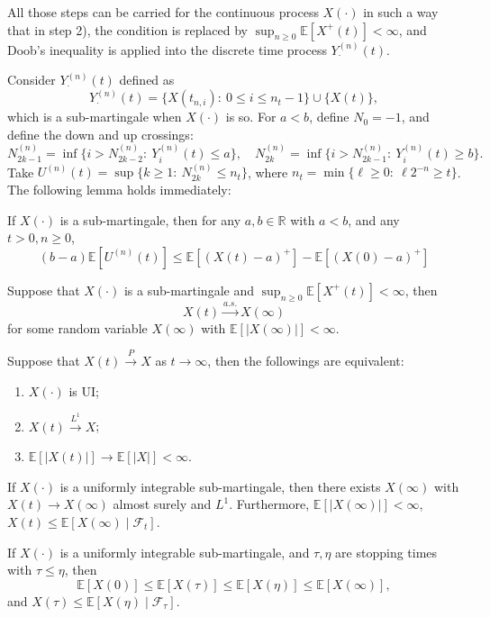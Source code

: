 All those steps can be carried for the continuous process $X(\cdot)$ in such a way that in step 2), the condition is replaced by $\sup_{n\ge0}\mathbb{E}[X^+(t)]<\infty$, and Doob's inequality is applied into the discrete time process $Y_{\cdot}^{(n)}(t)$.

Consider $Y_{\cdot}^{(n)}(t)$ defined as
\[
Y_{\cdot}^{(n)}(t)=\{X(t_{n,i}):~0\le i\le n_t-1\}\cup\{X(t)\},
\]
which is a sub-martingale when $X(\cdot)$ is so.
For $a<b$, define $N_0=-1$, and define the down and up crossings:
\[
N_{2k-1}^{(n)}=\inf\{i> N_{2k-2}^{(n)}:~Y_i^{(n)}(t)\le a\},\quad
N_{2k}^{(n)}=\inf\{i> N_{2k-1}^{(n)}:~Y_i^{(n)}(t)\ge b\}.
\]
Take $U^{(n)}(t)=\sup\{k\ge1:~N_{2k}^{(n)}\le n_t\}$, where $n_t=\min\{\ell\ge0:~\ell 2^{-n}\ge t\}$.
The following lemma holds immediately:

\begin{proposition}
If $X(\cdot)$ is a sub-martingale, then for any $a,b\in\mathbb{R}$ with $a<b$, and any $t>0,n\ge0$,
\[
(b-a)\mathbb{E}[U^{(n)}(t)]\le \mathbb{E}[(X(t) - a)^+] - \mathbb{E}[(X(0) - a)^+]
\]
\end{proposition}

\begin{theorem}
Suppose that $X(\cdot)$ is a sub-martingale and $\sup_{n\ge0}\mathbb{E}[X^+(t)]<\infty$, then
\[
X(t)\xrightarrow{a.s.}X(\infty)
\]
for some random variable $X(\infty)$ with $\mathbb{E}[|X(\infty)|]<\infty$.
\end{theorem}

\begin{theorem}
Suppose that $X(t)\xrightarrow{P}X$ as $t\to\infty$, then the followings are equivalent:
\begin{enumerate}
\item
$X(\cdot)$ is UI;
\item
$X(t)\xrightarrow{L^1}X$;
\item
$\mathbb{E}[|X(t)|]\to\mathbb{E}[|X|]<\infty$.
\end{enumerate}
\end{theorem}

\begin{theorem}
If $X(\cdot)$ is a uniformly integrable sub-martingale, then there exists $X(\infty)$ with $X(t)\to X(\infty)$ almost surely and $L^1$. Furthermore, $\mathbb{E}[|X(\infty)|]<\infty$, $X(t)\le\mathbb{E}[X(\infty)\mid\mathcal{F}_t]$.
\end{theorem}

\begin{theorem}
If $X(\cdot)$ is a uniformly integrable sub-martingale, and $\tau,\eta$ are stopping times with $\tau\le\eta$, then
\[
\mathbb{E}[X(0)]\le \mathbb{E}[X(\tau)]\le \mathbb{E}[X(\eta)]\le \mathbb{E}[X(\infty)],
\]
and $X(\tau)\le \mathbb{E}[X(\eta)\mid\mathcal{F}_{\tau}]$.
\end{theorem}







